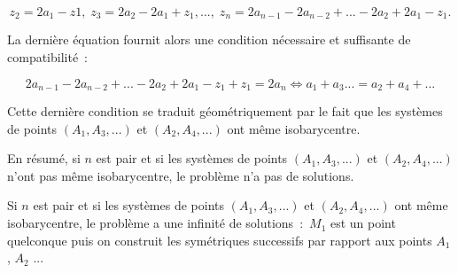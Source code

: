 {{$$z_2=2a_1-z1,\;z_3=2a_2-2a_1+z_1,...,\;z_n=2a_{n-1}-2a_{n-2}+...-2a_2+2a_1-z_1.$$

La dernière équation fournit alors une condition nécessaire et suffisante de compatibilité~:

$$2a_{n-1}-2a_{n-2}+...-2a_2+2a_1-z_1+z_1=2a_n\Leftrightarrow a_1+a_3...=a_2+a_4+...$$

Cette dernière condition se traduit géométriquement par le fait que les systèmes de points $(A_1,A_3,...)$ et
$(A_2,A_4,...)$ ont même isobarycentre.

En résumé, si $n$ est pair et si les systèmes de points $(A_1,A_3,...)$ et $(A_2,A_4,...)$ n'ont pas même isobarycentre, le problème n'a pas de solutions.

Si $n$ est pair et si les systèmes de points $(A_1,A_3,...)$ et $(A_2,A_4,...)$ ont même isobarycentre, le problème a une infinité de solutions~:~$M_1$ est un point quelconque puis on construit les symétriques successifs par rapport aux points $A_1$, $A_2$ ...
}
}
